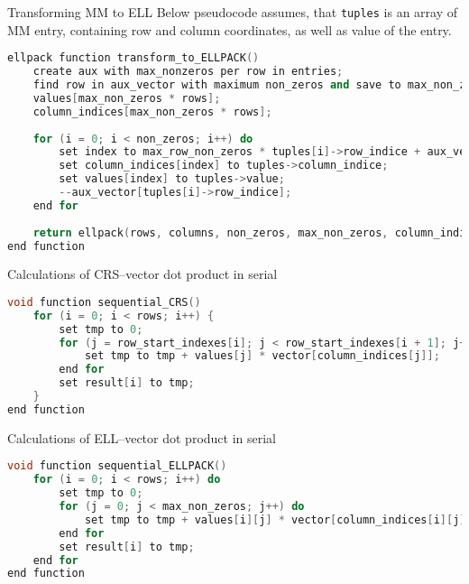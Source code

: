 	\begin{concerns}{Transforming \gls{MM} to \gls{ELL}}{}
		Below pseudocode assumes, that \texttt{tuples} is an array of \gls{MM} entry, containing row and column coordinates, as well as value of the entry.
		\begin{lstlisting}[language=C++, caption={Pseudocode of transforming algorithm from \gls{MM} to \gls{ELL} format.}]
ellpack function transform_to_ELLPACK()
	create aux with max_nonzeros per row in entries;
	find row in aux_vector with maximum non_zeros and save to max_non_zeros;
	values[max_non_zeros * rows];
	column_indices[max_non_zeros * rows];
	
	for (i = 0; i < non_zeros; i++) do
		set index to max_row_non_zeros * tuples[i]->row_indice + aux_vector[tuples[i]->row_indice] - 1;
		set column_indices[index] to tuples->column_indice;
		set values[index] to tuples->value;
		--aux_vector[tuples[i]->row_indice];
	end for
	
	return ellpack(rows, columns, non_zeros, max_non_zeros, column_indices, values);
end function
		\end{lstlisting}
	\end{concerns}

	\begin{concerns}{Calculations of \gls{CRS}--vector dot product in serial}{}
		\begin{lstlisting}[language=C++, caption={Pseudocode of \gls{CRS}--vector dot product in serial.}]
void function sequential_CRS()
	for (i = 0; i < rows; i++) {
		set tmp to 0;
		for (j = row_start_indexes[i]; j < row_start_indexes[i + 1]; j++) do
			set tmp to tmp + values[j] * vector[column_indices[j]];
		end for
		set result[i] to tmp;
	}
end function
		\end{lstlisting}
	\end{concerns}
	\clearpage
	\begin{concerns}{Calculations of \gls{ELL}--vector dot product in serial}{}
		\begin{lstlisting}[language=C++, caption={Pseudocode of \gls{ELL}--vector dot product in serial.}]
void function sequential_ELLPACK() 
	for (i = 0; i < rows; i++) do
		set tmp to 0;
		for (j = 0; j < max_non_zeros; j++) do
			set tmp to tmp + values[i][j] * vector[column_indices[i][j]];
		end for
		set result[i] to tmp;
	end for
end function
		\end{lstlisting}
	\end{concerns}	

